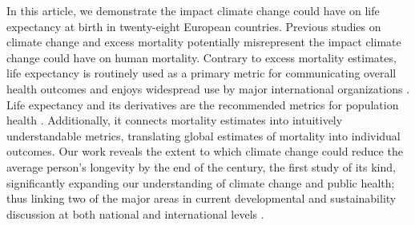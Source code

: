 \documentclass[12pt,]{article}
\begin{document}
In this article, we demonstrate the impact climate change could have on
life expectancy at birth in twenty-eight European countries. Previous
studies on climate change and excess mortality potentially misrepresent
the impact climate change could have on human mortality. Contrary to
excess mortality estimates, life expectancy is routinely used as a
primary metric for communicating overall health outcomes and enjoys
widespread use by major international organizations
\citep{world2015world, marmot2012building, salomon2012healthy}. Life
expectancy and its derivatives are the recommended metrics for
population health \citep{parrish2010peer}. Additionally, it connects
mortality estimates into intuitively understandable metrics, translating
global estimates of mortality into individual outcomes. Our work reveals
the extent to which climate change could reduce the average person's
longevity by the end of the century, the first study of its kind,
significantly expanding our understanding of climate change and public
health; thus linking two of the major areas in current developmental and
sustainability discussion at both national and international levels
\citep{abel2016meeting}.
\end{document}
